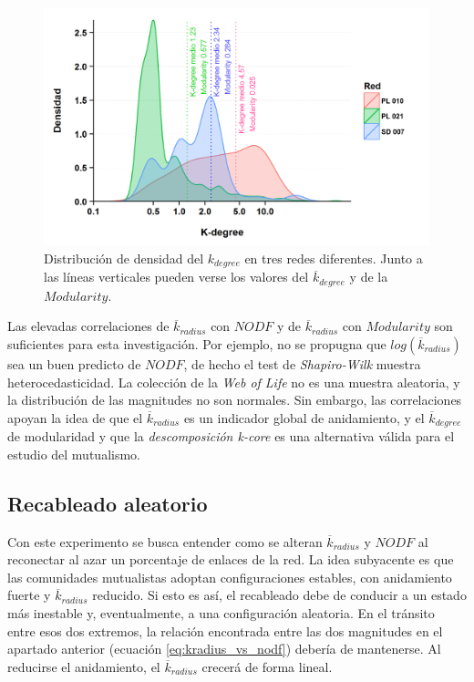 \begin{figure}[h!]
\centering
\includegraphics[scale=0.85]{ESTATICA_density_plots.png}
\caption {Distribución de densidad del $k_{degree}$ en tres redes diferentes. Junto a las líneas verticales pueden verse los valores del $\overline {k}_{degree}$ y de la $Modularity$.}
\label{fig:ESTATICA_density_plots}
\end{figure}

Las elevadas correlaciones de $\overline {k}_{radius}$ con $NODF$ y de $\overline {k}_{radius}$ con $Modularity$ son suficientes para esta investigación. Por ejemplo, no se propugna que $log(\overline {k}_{radius})$ sea un buen predicto de $NODF$, de hecho el test de \textit{Shapiro-Wilk} muestra heterocedasticidad. La colección de la \textit{Web of Life} no es una muestra aleatoria, y la distribución de las magnitudes no son normales. Sin embargo, las correlaciones apoyan la idea de que el $\overline {k}_{radius}$ es un indicador global de anidamiento, y el $\overline {k}_{degree}$ de modularidad y que la \textit{descomposición k-core} es una alternativa válida para el estudio del mutualismo.

\subsection{Recableado aleatorio}

Con este experimento se busca entender como se alteran $\overline {k}_{radius}$ y $NODF$ al reconectar al azar un porcentaje de enlaces de la red. La idea subyacente es que las comunidades mutualistas adoptan configuraciones estables, con anidamiento fuerte y $\overline {k}_{radius}$ reducido. Si esto es así, el recableado debe de conducir a un estado más inestable y, eventualmente, a una configuración aleatoria. En el tránsito entre esos dos extremos, la relación encontrada entre las dos magnitudes en el apartado anterior (ecuación \ref{eq:kradius_vs_nodf}) debería de mantenerse. Al reducirse el anidamiento, el $\overline {k}_{radius}$ crecerá de forma lineal.

